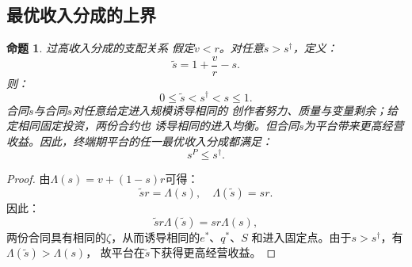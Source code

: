 \documentclass[UTF8, a4paper, 12pt, fontset=fandol]{ctexart}
\newtheorem{proposition}[theorem]{命题}
\theoremstyle{definition}
\theoremstyle{remark}
\begin{document}
\subsection{最优收入分成的上界}
\begin{proposition}{过高收入分成的支配关系}
  假定$v < r$。对任意$s > s^\dagger$，定义：
  \begin{equation*}
    \tilde{s} = 1 + \frac{v}{r} - s.
  \end{equation*}
  则：
  \begin{equation*}
    0 \le \tilde{s} < s^\dagger < s \le 1.
  \end{equation*}
  合同$\tilde{s}$与合同$s$对任意给定进入规模诱导相同的
  创作者努力、质量与变量剩余；给定相同固定投资，两份合约也
  诱导相同的进入均衡。但合同$\tilde{s}$为平台带来更高经营
  收益。因此，终端期平台的任一最优收入分成都满足：
  \begin{equation*}
    s^P \le s^\dagger.
  \end{equation*}
\end{proposition}
\begin{proof}
  由$\Lambda(s)=v+(1-s)r$可得：
  \begin{equation*}
    \tilde{s}r=\Lambda(s),\quad \Lambda(\tilde{s})=sr.
  \end{equation*}
  因此：
  \begin{equation*}
    \tilde{s}r\Lambda(\tilde{s})=sr\Lambda(s),
  \end{equation*}
  两份合同具有相同的$\zeta$，从而诱导相同的$e^*$、$q^*$、$S$
  和进入固定点。由于$s > s^\dagger$，有$\Lambda(\tilde{s})>\Lambda(s)$，
  故平台在$\tilde{s}$下获得更高经营收益。
\end{proof}
\end{document}
